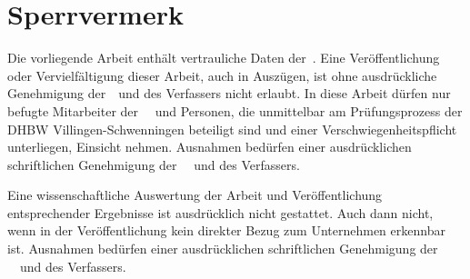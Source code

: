 
\newpage
\thispagestyle{empty}

\section*{Sperrvermerk}

Die vorliegende Arbeit enthält vertrauliche Daten der\ \mycompany .
Eine Veröffentlichung oder Vervielfältigung dieser Arbeit, auch in Auszügen, ist ohne ausdrückliche Genehmigung der\ \mycompany \ und des Verfassers nicht erlaubt.
In diese Arbeit dürfen nur befugte Mitarbeiter der \ \mycompany \ und Personen, die unmittelbar am Prüfungsprozess der DHBW Villingen-Schwenningen beteiligt sind und einer Verschwiegenheitspflicht unterliegen, Einsicht nehmen.
Ausnahmen bedürfen einer ausdrücklichen schriftlichen Genehmigung der \ \mycompany \ und des Verfassers.

Eine wissenschaftliche Auswertung der Arbeit und Veröffentlichung entsprechender Ergebnisse ist ausdrücklich nicht gestattet.
Auch dann nicht, wenn in der Veröffentlichung kein direkter Bezug zum Unternehmen erkennbar ist.
Ausnahmen bedürfen einer ausdrücklichen schriftlichen Genehmigung der \ \mycompany \ und des Verfassers.